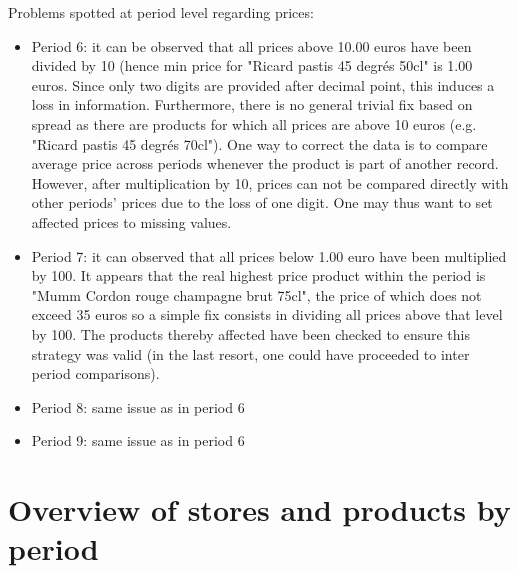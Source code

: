 \documentclass[11pt]{article}
\begin{document}
Problems spotted at period level regarding prices:
\begin{itemize}
\item Period 6: it can be observed that all prices above 10.00 euros have been divided by 10 (hence min price for "Ricard pastis 45 degrés 50cl" is 1.00 euros. Since only two digits are provided after decimal point, this induces a loss in information. Furthermore, there is no general trivial fix based on spread as there are products for which all prices are above 10 euros (e.g. "Ricard pastis 45 degrés 70cl"). One way to correct the data is to compare average price across periods whenever the product is part of another record. However, after multiplication by 10, prices can not be compared directly with other periods' prices due to the loss of one digit. One may thus want to set affected prices to missing values.
\item Period 7:  it can observed that all prices below 1.00 euro have been multiplied by 100. It appears that the real highest price product within the period is "Mumm Cordon rouge champagne brut 75cl", the price of which does not exceed 35 euros so a simple fix consists in dividing all prices above that level by 100. The products thereby affected have been checked to ensure this strategy was valid (in the last resort, one could have proceeded to inter period comparisons).
\item Period 8: same issue as in period 6
\item Period 9: same issue as in period 6
\end{itemize}

\section{Overview of stores and products by period}
\end{document}
